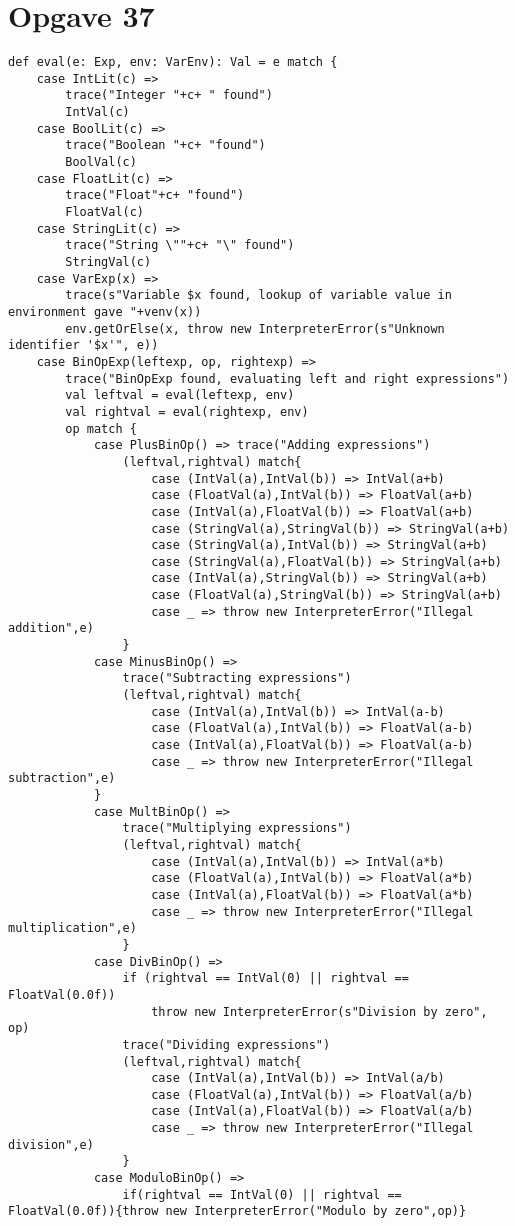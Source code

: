 \documentclass[a4paper, 10pt]{article}
\begin{document}
\section*{Opgave 37}
\begin{lstlisting}
def eval(e: Exp, env: VarEnv): Val = e match {
	case IntLit(c) =>
		trace("Integer "+c+ " found")
		IntVal(c)
	case BoolLit(c) =>
		trace("Boolean "+c+ "found")
		BoolVal(c)
	case FloatLit(c) =>
		trace("Float"+c+ "found")
		FloatVal(c)
	case StringLit(c) =>
		trace("String \""+c+ "\" found")
		StringVal(c)
	case VarExp(x) =>
		trace(s"Variable $x found, lookup of variable value in environment gave "+venv(x))
		env.getOrElse(x, throw new InterpreterError(s"Unknown identifier '$x'", e))
	case BinOpExp(leftexp, op, rightexp) =>
		trace("BinOpExp found, evaluating left and right expressions")
		val leftval = eval(leftexp, env)
		val rightval = eval(rightexp, env)
		op match {
			case PlusBinOp() => trace("Adding expressions")
				(leftval,rightval) match{
					case (IntVal(a),IntVal(b)) => IntVal(a+b)
					case (FloatVal(a),IntVal(b)) => FloatVal(a+b)
					case (IntVal(a),FloatVal(b)) => FloatVal(a+b)
					case (StringVal(a),StringVal(b)) => StringVal(a+b)
					case (StringVal(a),IntVal(b)) => StringVal(a+b)
					case (StringVal(a),FloatVal(b)) => StringVal(a+b)
					case (IntVal(a),StringVal(b)) => StringVal(a+b)
					case (FloatVal(a),StringVal(b)) => StringVal(a+b)
					case _ => throw new InterpreterError("Illegal addition",e)
				}
			case MinusBinOp() =>
				trace("Subtracting expressions")
				(leftval,rightval) match{
					case (IntVal(a),IntVal(b)) => IntVal(a-b)
					case (FloatVal(a),IntVal(b)) => FloatVal(a-b)
					case (IntVal(a),FloatVal(b)) => FloatVal(a-b)
					case _ => throw new InterpreterError("Illegal subtraction",e)
			}
			case MultBinOp() =>
				trace("Multiplying expressions")
				(leftval,rightval) match{
					case (IntVal(a),IntVal(b)) => IntVal(a*b)
					case (FloatVal(a),IntVal(b)) => FloatVal(a*b)
					case (IntVal(a),FloatVal(b)) => FloatVal(a*b)
					case _ => throw new InterpreterError("Illegal multiplication",e)
				}
			case DivBinOp() =>
				if (rightval == IntVal(0) || rightval == FloatVal(0.0f))
					throw new InterpreterError(s"Division by zero", op)
				trace("Dividing expressions")
				(leftval,rightval) match{
					case (IntVal(a),IntVal(b)) => IntVal(a/b)
					case (FloatVal(a),IntVal(b)) => FloatVal(a/b)
					case (IntVal(a),FloatVal(b)) => FloatVal(a/b)
					case _ => throw new InterpreterError("Illegal division",e)
				}
			case ModuloBinOp() =>
				if(rightval == IntVal(0) || rightval == FloatVal(0.0f)){throw new InterpreterError("Modulo by zero",op)}

\end{lstlisting}
\end{document}
